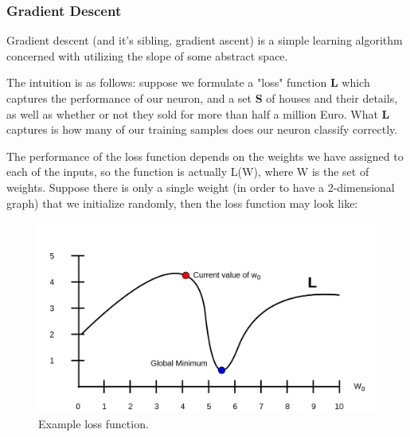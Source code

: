 \documentclass[a4paper, 12pt]{article}
\begin{document}
                    \subsubsection{Gradient Descent}
                    
                        \par Gradient descent (and it's sibling, gradient ascent) is a simple learning algorithm concerned with utilizing the slope of some abstract space. 
                        
                        \par The intuition is as follows: suppose we formulate a "loss" function \textbf{L} which captures the performance of our neuron, and a set \textbf{S} of houses and their details, as well as whether or not they sold for more than half a million Euro. What \textbf{L} captures is how many of our training samples does our neuron classify correctly.     
                        
                        \par The performance of the loss function depends on the weights we have assigned to each of the inputs, so the function is actually L(W), where W is the set of weights. Suppose there is only a single weight (in order to have a 2-dimensional graph) that we initialize randomly, then the loss function may look like:
                        
                        \begin{figure}[h]
                            \caption{Example loss function.}
                            \centering
                            \includegraphics[width=\textwidth]{lossFunction0}
                        \end{figure}
                        
\end{document}
